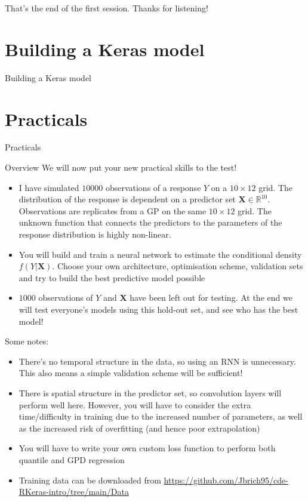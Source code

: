 \documentclass{beamer}
\begin{document}
\begin{frame}
\begin{center}
\Huge That's the end of the first session. Thanks for listening!
\end{center}
\end{frame}
\section{Building a Keras model}
\begin{frame}
\begin{center}
\Huge Building a Keras model 
\end{center}
\end{frame}
\section{Practicals}
\begin{frame}
\begin{center}
\Huge Practicals
\end{center}
\end{frame}
\begin{frame}{Overview}
We will now put your new practical skills to the test!
\begin{itemize}
\item I have simulated $10000$ observations of a response $Y$ on a $10\times 12$ grid. The distribution of the response is dependent on a predictor set $\mathbf{X}\in\mathbb{R}^{10}$. Observations are replicates from a GP on the same $10\times 12$ grid. The unknown function that connects the predictors to the parameters of the response distribution is highly non-linear.
\item You will build and train a neural network to estimate the conditional density $f(Y|\mathbf{X})$. Choose your own architecture, optimisation scheme, validation sets and try to build the best predictive model possible
\item $1000$ observations of $Y$ and $\mathbf{X}$ have been left out for testing. At the end we will test everyone's models using this hold-out set, and see who has the best model!
\end{itemize}
\end{frame}
\begin{frame}
Some notes:
\begin{itemize}
\item There's no temporal structure in the data, so using an RNN is unnecessary. This also means a simple validation scheme will be sufficient!
\item There is spatial structure in the predictor set, so convolution layers will perform well here. However, you will have to consider the extra time/difficulty in training due to the increased number of parameters, as well as the increased risk of overfitting (and hence poor extrapolation)
\item You will have to write your own custom loss function to perform both quantile and GPD regression
\item Training data can be downloaded from \url{https://github.com/Jbrich95/cde-RKeras-intro/tree/main/Data}
\end{itemize}
\end{frame}
\end{document}
